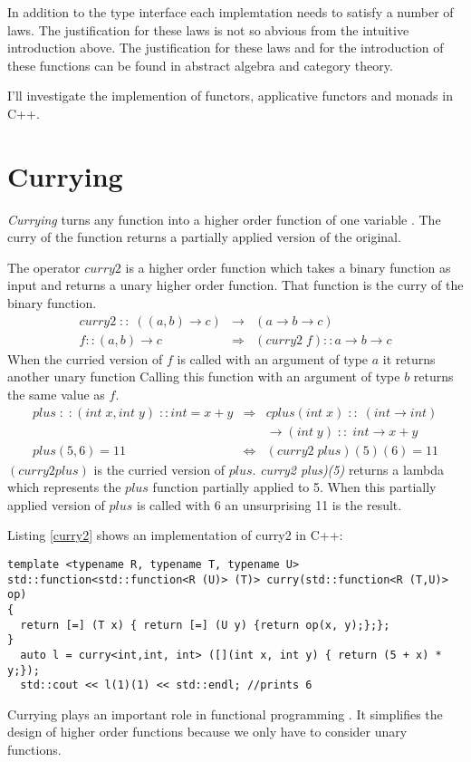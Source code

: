 \documentclass[12pt,fleqn]{article}
\begin{document}
In addition to the type interface each implemtation needs to satisfy a number of laws.
The justification for these laws is not so abvious from the intuitive introduction above.
The justification for these laws and for the introduction of these functions can be found in abstract algebra and category theory.

I'll investigate the implemention of functors, applicative functors and monads in C++.

 
\section*{Currying}
{\em Currying} turns any function into a higher order function of one variable \cite{field}.
The curry of the function returns a partially applied version of the original.

The operator $curry2$ is a higher order function which takes a binary function as input 
and returns a unary higher order function.
That function is the curry of the binary function.
\begin{eqnarray*}
curry2 \; :: \; ((a,b) \rightarrow c) &\rightarrow& (a \rightarrow b \rightarrow c) \\
f::(a,b) \rightarrow c &\Rightarrow&  (curry2\;f)::a \rightarrow b \rightarrow c 
\end{eqnarray*}
When the curried version of $f$ is called with an argument of type $a$ it returns another unary function 
Calling this function with an argument of type $b$ returns the same value as $f$.
\begin{eqnarray*}
plus\;:\;:(int \;x, int \;y) \;::int = x+y &\Rightarrow& cplus(int\; x) \;::\; (int \rightarrow int)  \\
                                                             & & \rightarrow (int \; y) \;::\; int \rightarrow x+y  \\
plus(5,6) = 11 &\Leftrightarrow&(curry2 \; plus)(5)(6) = 11
\end{eqnarray*}
$(curry2 plus)$ is the curried version of $plus$.
{\em curry2 plus)(5)} returns a lambda which represents the $plus$ function partially applied to 5. 
When this partially applied version of $plus$ is called with 6 an unsurprising 11 is the result.

Listing \ref{curry2} shows an implementation of curry2 in C++: 
\begin{lstlisting}[caption=curry for binary operators, label=curry2]
template <typename R, typename T, typename U>
std::function<std::function<R (U)> (T)> curry(std::function<R (T,U)> op)
{
  return [=] (T x) { return [=] (U y) {return op(x, y);};};
}
  auto l = curry<int,int, int> ([](int x, int y) { return (5 + x) * y;});
  std::cout << l(1)(1) << std::endl; //prints 6
\end{lstlisting}
Currying plays an important role in functional programming \cite{field}. 
It simplifies the design of higher order functions because we only have to consider unary functions.
\end{document}
